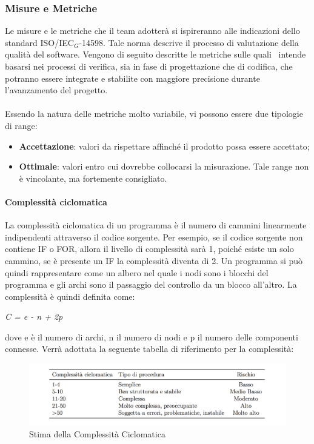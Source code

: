 \subsubsection{Misure e Metriche}
Le misure e le metriche che il team adotterà si ispireranno alle indicazioni dello standard ISO/IEC$_G$-14598. Tale norma descrive il processo di valutazione della qualità del software. Vengono di seguito descritte le metriche sulle quali \gruppo\ intende basarsi nei processi di verifica, sia in fase di progettazione che di codifica, che potranno essere integrate e stabilite con maggiore precisione durante l'avanzamento del progetto.
\\ \\
Essendo la natura delle metriche molto variabile, vi possono essere due tipologie di range:

\begin{itemize}
\item \textbf{Accettazione}: valori da rispettare affinché il prodotto possa essere accettato;
\item \textbf{Ottimale}: valori entro cui dovrebbe collocarsi la misurazione. Tale range non è vincolante, ma fortemente consigliato.
\end{itemize}

\paragraph{Complessità ciclomatica} 
    La complessità ciclomatica di un programma è il
    numero di cammini linearmente indipendenti attraverso il codice sorgente. Per esempio, se il codice sorgente non contiene IF o FOR, allora il livello di complessità sarà 1, poiché esiste un solo 
    cammino, se è presente un IF la complessità diventa di 2. Un programma si può quindi rappresentare come un albero nel quale i nodi sono i blocchi del programma e gli archi sono il passaggio del controllo da un blocco all'altro. La complessità è quindi definita come:
    \begin{center}
    	\textit{C = e - n + 2p}
    \end{center}
    dove e è il numero di archi, n il numero di nodi e p il numero delle componenti connesse.  Verrà adottata la seguente tabella di riferimento per la complessità: 
    \begin{figure}[h!]
    	\centering
    	\includegraphics[scale=.45]{img/tabella_CC.png}
    	\caption{Stima della Complessità Ciclomatica}
    \end{figure} 
    
